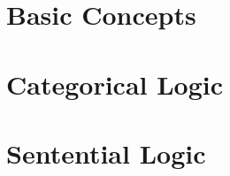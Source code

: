 \documentclass[twoside, openright]{book}
\begin{document}

\raggedright
\setlength{\parindent}{1em}
\setlength{\parskip}{1em}	

\frontmatter
\pagestyle{plain} %

	


{
\setlength{\parskip}{0em}

\renewcommand{\cftpartpresnum}{\sf\Large\partname\ }
\tableofcontents
}

	




\mainmatter
\setlength{\parindent}{1em}
\pagestyle{headings} %
\label{full_version} %


\part{Basic Concepts} \label{part:basic_concepts}
	



\part{Categorical Logic}
\label{part:cat_logic}

\part{Sentential Logic} \label{part:sent_logic}
	

%
%
%
\end{document}
